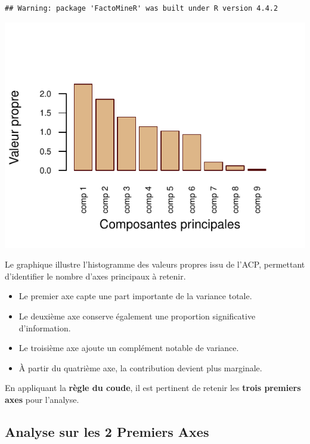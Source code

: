 \documentclass[
  12pt,
]{article}
\providecommand{\tightlist}{%
  \setlength{\itemsep}{0pt}\setlength{\parskip}{0pt}}
\begin{document}
\begin{verbatim}
## Warning: package 'FactoMineR' was built under R version 4.4.2
\end{verbatim}

\begin{center}\includegraphics{rmd_final_files/figure-latex/unnamed-chunk-10-1} \end{center}

Le graphique illustre l'histogramme des valeurs propres issu de l'ACP,
permettant d'identifier le nombre d'axes principaux à retenir.

\begin{itemize}
\tightlist
\item
  Le premier axe capte une part importante de la variance totale.
\item
  Le deuxième axe conserve également une proportion significative
  d'information.
\item
  Le troisième axe ajoute un complément notable de variance.
\item
  À partir du quatrième axe, la contribution devient plus marginale.
\end{itemize}

En appliquant la \textbf{règle du coude}, il est pertinent de retenir
les \textbf{trois premiers axes} pour l'analyse.

\subsection{Analyse sur les 2 Premiers
Axes}\label{analyse-sur-les-2-premiers-axes}
\end{document}

